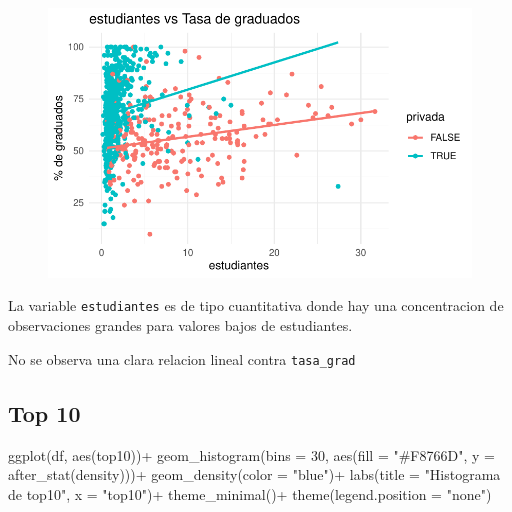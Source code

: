 \documentclass[
  letterpaper,
  DIV=11,
  numbers=noendperiod]{scrartcl}
\newenvironment{Shaded}{\begin{snugshade}}{\end{snugshade}}
\newcommand{\AttributeTok}[1]{\textcolor[rgb]{0.40,0.45,0.13}{#1}}
\newcommand{\DecValTok}[1]{\textcolor[rgb]{0.68,0.00,0.00}{#1}}
\newcommand{\FunctionTok}[1]{\textcolor[rgb]{0.28,0.35,0.67}{#1}}
\newcommand{\NormalTok}[1]{\textcolor[rgb]{0.00,0.23,0.31}{#1}}
\newcommand{\SpecialCharTok}[1]{\textcolor[rgb]{0.37,0.37,0.37}{#1}}
\newcommand{\StringTok}[1]{\textcolor[rgb]{0.13,0.47,0.30}{#1}}
\begin{document}
\begin{figure}[H]

{\centering \includegraphics{TP_final_files/figure-pdf/unnamed-chunk-14-1.pdf}

}

\end{figure}

La variable \texttt{estudiantes} es de tipo cuantitativa donde hay una
concentracion de observaciones grandes para valores bajos de
estudiantes.

No se observa una clara relacion lineal contra \texttt{tasa\_grad}

\hypertarget{top-10}{%
\subsection{Top 10}\label{top-10}}

\begin{Shaded}
\begin{Highlighting}[]
\FunctionTok{ggplot}\NormalTok{(df, }\FunctionTok{aes}\NormalTok{(top10))}\SpecialCharTok{+}
  \FunctionTok{geom\_histogram}\NormalTok{(}\AttributeTok{bins =} \DecValTok{30}\NormalTok{, }\FunctionTok{aes}\NormalTok{(}\AttributeTok{fill =} \StringTok{"\#F8766D"}\NormalTok{, }\AttributeTok{y =} \FunctionTok{after\_stat}\NormalTok{(density)))}\SpecialCharTok{+}
  \FunctionTok{geom\_density}\NormalTok{(}\AttributeTok{color =} \StringTok{"blue"}\NormalTok{)}\SpecialCharTok{+}
  \FunctionTok{labs}\NormalTok{(}\AttributeTok{title =} \StringTok{"Histograma de top10"}\NormalTok{,}
       \AttributeTok{x =} \StringTok{"top10"}\NormalTok{)}\SpecialCharTok{+}
  \FunctionTok{theme\_minimal}\NormalTok{()}\SpecialCharTok{+}
  \FunctionTok{theme}\NormalTok{(}\AttributeTok{legend.position =} \StringTok{"none"}\NormalTok{)}
\end{Highlighting}
\end{Shaded}
\end{document}
